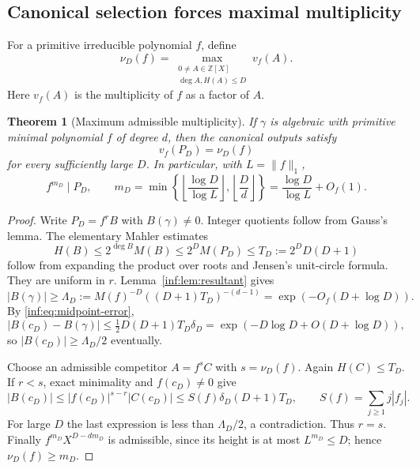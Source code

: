 \documentclass[11pt,a4paper]{article}
\newcommand{\Z}{\mathbb Z}
\newtheorem{theorem}{Theorem}[section]
\theoremstyle{definition}
\theoremstyle{remark}
\numberwithin{equation}{section}
\begin{document}
\subsection{Canonical selection forces maximal multiplicity}
\label{inf:sub:multiplicity}
For a primitive irreducible polynomial $f$, define
\[
 \nu_D(f)=\max_{\substack{0\ne A\in\Z[X]\\\deg A,H(A)\le D}}v_f(A).
\]
Here $v_f(A)$ is the multiplicity of $f$ as a factor of $A$.

\begin{theorem}[Maximum admissible multiplicity]\label{inf:thm:multiplicity}
If $\gamma$ is algebraic with primitive minimal polynomial $f$ of degree $d$, then the canonical outputs satisfy
\[
 v_f(P_D)=\nu_D(f)
\]
for every sufficiently large $D$. In particular, with $L=\|f\|_1$,
\[
 f^{m_D}\mid P_D,\qquad
 m_D=\min\left\{\left\lfloor\frac{\log D}{\log L}\right\rfloor,
                  \left\lfloor\frac Dd\right\rfloor\right\}
     =\frac{\log D}{\log L}+O_f(1).
\]
\end{theorem}
\begin{proof}
Write $P_D=f^rB$ with $B(\gamma)\ne0$. Integer quotients follow from Gauss's lemma. The elementary Mahler estimates
\[
 H(B)\le2^{\deg B}M(B)\le2^DM(P_D)\le T_D:=2^DD(D+1)
\]
follow from expanding the product over roots and Jensen's unit-circle formula. They are uniform in $r$. Lemma~\ref{inf:lem:resultant} gives
\[
 |B(\gamma)|\ge\Lambda_D:=M(f)^{-D}((D+1)T_D)^{-(d-1)}
                         =\exp(-O_f(D+\log D)).
\]
By \eqref{inf:eq:midpoint-error},
\[
 |B(c_D)-B(\gamma)|\le\tfrac12D(D+1)T_D\delta_D
                  =\exp(-D\log D+O(D+\log D)),
\]
so $|B(c_D)|\ge\Lambda_D/2$ eventually.

Choose an admissible competitor $A=f^sC$ with $s=\nu_D(f)$. Again $H(C)\le T_D$. If $r<s$, exact minimality and $f(c_D)\ne0$ give
\[
 |B(c_D)|\le |f(c_D)|^{s-r}|C(c_D)|
 \le S(f)\delta_D(D+1)T_D,
 \qquad S(f)=\sum_{j\ge1}j|f_j|.
\]
For large $D$ the last expression is less than $\Lambda_D/2$, a contradiction. Thus $r=s$. Finally $f^{m_D}X^{D-dm_D}$ is admissible, since its height is at most $L^{m_D}\le D$; hence $\nu_D(f)\ge m_D$.
\end{proof}
\end{document}
